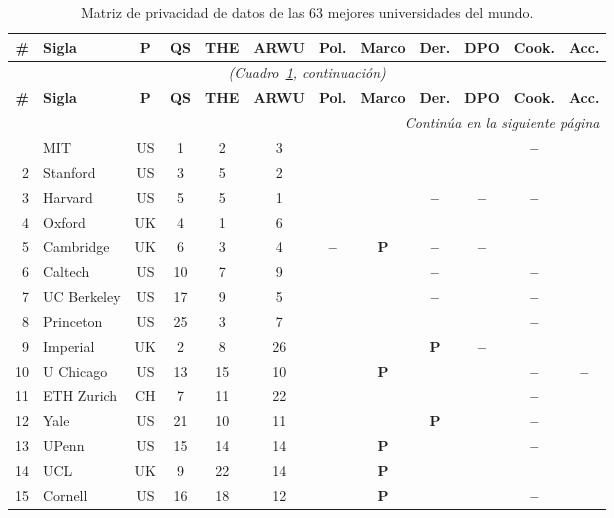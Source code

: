 \documentclass[pdflatex,sn-basic,Numbered]{sn-jnl}
\newcommand{\si}{\ding{51}}
\newcommand{\no}{\textcolor{gris}{\textbf{--}}}
\newcommand{\pc}{\textbf{P}}
\theoremstyle{thmstyleone}
\theoremstyle{thmstyletwo}
\theoremstyle{thmstylethree}
\begin{document}
\begin{appendices}
\footnotesize
\begin{longtable}{@{}r l c c c c c c c c c c@{}}
	\caption{Matriz de privacidad de datos de las 63 mejores universidades del mundo.}\label{tab:mundo}\\
	\toprule
	\textbf{\#} & \textbf{Sigla} & \textbf{P} & \textbf{QS} & \textbf{THE} & \textbf{ARWU} & \textbf{Pol.} & \textbf{Marco} & \textbf{Der.} & \textbf{DPO} & \textbf{Cook.} & \textbf{Acc.} \\
	\midrule
	\endfirsthead
	\multicolumn{12}{c}{\textit{(Cuadro~\ref{tab:mundo}, continuaci\'on)}}\\
	\toprule
	\textbf{\#} & \textbf{Sigla} & \textbf{P} & \textbf{QS} & \textbf{THE} & \textbf{ARWU} & \textbf{Pol.} & \textbf{Marco} & \textbf{Der.} & \textbf{DPO} & \textbf{Cook.} & \textbf{Acc.} \\
	\midrule
	\endhead
	\midrule
	\multicolumn{12}{r}{\textit{Contin\'ua en la siguiente p\'agina}}\\
	\endfoot
	\bottomrule
	\endlastfoot
	1 & MIT & US & 1 & 2 & 3 & \si & \si & \si & \si & \no & \si \\
	2 & Stanford & US & 3 & 5 & 2 & \si & \si & \si & \si & \si & \si \\
	3 & Harvard & US & 5 & 5 & 1 & \si & \si & \no & \no & \no & \si \\
	4 & Oxford & UK & 4 & 1 & 6 & \si & \si & \si & \si & \si & \si \\
	5 & Cambridge & UK & 6 & 3 & 4 & \no & \pc & \no & \no & \si & \si \\
	6 & Caltech & US & 10 & 7 & 9 & \si & \si & \no & \si & \no & \si \\
	7 & UC Berkeley & US & 17 & 9 & 5 & \si & \si & \no & \si & \no & \si \\
	8 & Princeton & US & 25 & 3 & 7 & \si & \si & \si & \si & \no & \si \\
	9 & Imperial & UK & 2 & 8 & 26 & \si & \si & \pc & \no & \si & \si \\
	10 & U Chicago & US & 13 & 15 & 10 & \si & \pc & \si & \si & \no & \no \\
	11 & ETH Zurich & CH & 7 & 11 & 22 & \si & \si & \si & \si & \no & \si \\
	12 & Yale & US & 21 & 10 & 11 & \si & \si & \pc & \si & \no & \si \\
	13 & UPenn & US & 15 & 14 & 14 & \si & \pc & \si & \si & \no & \si \\
	14 & UCL & UK & 9 & 22 & 14 & \si & \pc & \si & \si & \si & \si \\
	15 & Cornell & US & 16 & 18 & 12 & \si & \pc & \si & \si & \no & \si \\

\end{longtable}
\end{appendices}
\end{document}
